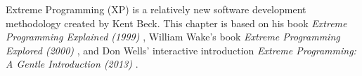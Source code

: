 Extreme Programming (XP) is a relatively new software development methodology created by Kent Beck. This chapter is based on his book \textit{Extreme Programming Explained (1999)} \citep{xp:explained}, William Wake's book \textit{Extreme Programming Explored (2000)} \citep{xp:explored}, and Don Wells' interactive introduction \textit{Extreme Programming: A Gentle Introduction (2013)} \citep{xp:online}.
